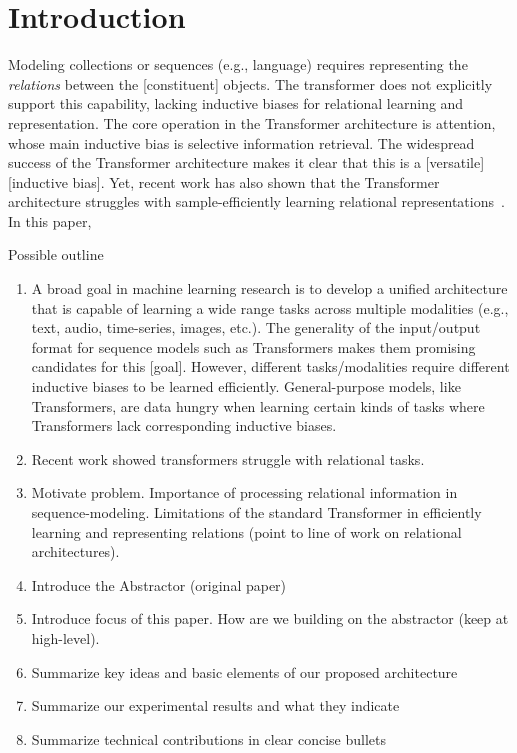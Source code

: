 \section{Introduction}\label{sec:intro}


Modeling collections or sequences (e.g., language) requires representing the \textit{relations} between the [constituent] objects. The transformer does not explicitly support this capability, lacking inductive biases for relational learning and representation. The core operation in the Transformer architecture is attention, whose main inductive bias is selective information retrieval. The widespread success of the Transformer architecture makes it clear that this is a [versatile] [inductive bias]. Yet, recent work has also shown that the Transformer architecture struggles with sample-efficiently learning relational representations~\citep{relnet,predinet,esbn,corelnet,relconvnet}. In this paper, 

Possible outline
\begin{enumerate}
  \item A broad goal in machine learning research is to develop a unified architecture that is capable of learning a wide range tasks across multiple modalities (e.g., text, audio, time-series, images, etc.). The generality of the input/output format for sequence models such as Transformers makes them promising candidates for this [goal]. However, different tasks/modalities require different inductive biases to be learned efficiently. General-purpose models, like Transformers, are data hungry when learning certain kinds of tasks where Transformers lack corresponding inductive biases. 
  \item Recent work showed transformers struggle with relational tasks.


  \item Motivate problem. Importance of processing relational information in sequence-modeling. Limitations of the standard Transformer in efficiently learning and representing relations (point to line of work on relational architectures).
  \item Introduce the Abstractor (original paper)
  \item Introduce focus of this paper. How are we building on the abstractor (keep at high-level).
  \item Summarize key ideas and basic elements of our proposed architecture
  \item Summarize our experimental results and what they indicate
  \item Summarize technical contributions in clear concise bullets
\end{enumerate}


